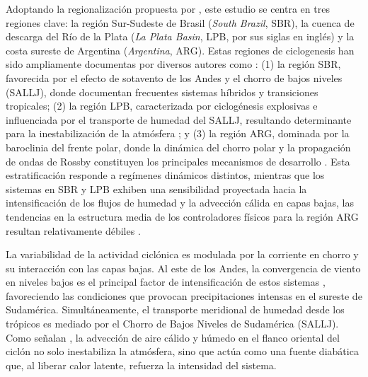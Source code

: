 \label{sec:definicion_regiones}%
Adoptando la regionalización propuesta por \citet{gramcianinov2019properties}, este estudio se centra en tres regiones clave: la región Sur-Sudeste de Brasil (\textit{South Brazil}, SBR), la cuenca de descarga del Río de la Plata (\textit{La Plata Basin}, LPB, por sus siglas en inglés) y la costa sureste de Argentina (\textit{Argentina}, ARG). Estas regiones de ciclogenesis han sido ampliamente documentas por diversos autores como \citet{reboita2010south, crespo2020potential, gramcianinov2019properties, reboita2026meteorology}: (1) la región SBR, favorecida por el efecto de sotavento de los Andes y el chorro de bajos niveles (SALLJ), donde \citet{reboita2022from} documentan frecuentes sistemas híbridos y transiciones tropicales; (2) la región LPB, caracterizada por ciclogénesis explosivas e influenciada por el transporte de humedad del SALLJ, resultando determinante para la inestabilización de la atmósfera \citep{crespo2020potential}; y (3) la región ARG, dominada por la baroclinia del frente polar, donde la dinámica del chorro polar y la propagación de ondas de Rossby constituyen los principales mecanismos de desarrollo \citep{simmonds2000variability}. Esta estratificación responde a regímenes dinámicos distintos, mientras que los sistemas en SBR y LPB exhiben una sensibilidad proyectada hacia la intensificación de los flujos de humedad y la advección cálida en capas bajas, las tendencias en la estructura media de los controladores físicos para la región ARG resultan relativamente débiles \citep{gramcianinov2024early}.

La variabilidad de la actividad ciclónica es modulada por la corriente en chorro y su interacción con las capas bajas. 
Al este de los Andes, la convergencia de viento en niveles bajos es el principal factor de intensificación de estos sistemas \citep{vera2002cold}, favoreciendo las condiciones que provocan precipitaciones intensas en el sureste de Sudamérica. 
Simultáneamente, el transporte meridional de humedad desde los trópicos es mediado por el Chorro de Bajos Niveles de Sudamérica (SALLJ). 
Como señalan \citet{reboita2022from}, la advección de aire cálido y húmedo en el flanco oriental del ciclón no solo inestabiliza la atmósfera, sino que actúa como una fuente diabática que, al liberar calor latente, refuerza la intensidad del sistema.

